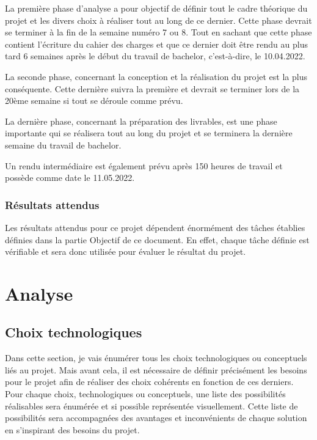 \documentclass[
    iai, %
    il, %
]{heig-tb}
\begin{document}
La première phase d'analyse a pour objectif de définir tout le cadre théorique du projet et les divers choix à réaliser tout au long de ce dernier.
Cette phase devrait se terminer à la fin de la semaine numéro 7 ou 8.
Tout en sachant que cette phase contient l'écriture du cahier des charges et que ce dernier doit être rendu au plus tard 6 semaines après le début du travail de bachelor, c'est-à-dire, le 10.04.2022.

La seconde phase, concernant la conception et la réalisation du projet est la plus conséquente.
Cette dernière suivra la première et devrait se terminer lors de la 20ème semaine si tout se déroule comme prévu.

La dernière phase, concernant la préparation des livrables, est une phase importante qui se réalisera tout au long du projet et se terminera la dernière semaine du travail de bachelor.

Un rendu intermédiaire est également prévu après 150 heures de travail et possède comme date le 11.05.2022.

\subsection{Résultats attendus}

Les résultats attendus pour ce projet dépendent énormément des tâches établies définies dans la partie Objectif de ce document.
En effet, chaque tâche définie est vérifiable et sera donc utilisée pour évaluer le résultat du projet.
\clearpage

\chapter{Analyse}

\section{Choix technologiques}

Dans cette section, je vais énumérer tous les choix technologiques ou conceptuels liés au projet.
Mais avant cela, il est nécessaire de définir précisément les besoins pour le projet afin de réaliser des choix cohérents en fonction de ces derniers.
Pour chaque choix, technologiques ou conceptuels, une liste des possibilités réalisables sera énumérée et si possible représentée visuellement.
Cette liste de possibilités sera accompagnées des avantages et inconvénients de chaque solution en s'inspirant des besoins du projet.
\end{document}
